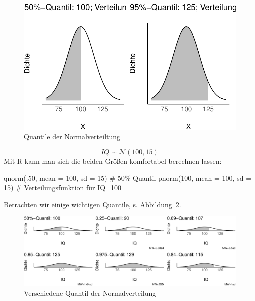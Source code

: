 \documentclass[
  a4paper,
  DIV=11]{scrreprt}
\newenvironment{Shaded}{\begin{snugshade}}{\end{snugshade}}
\newcommand{\AttributeTok}[1]{\textcolor[rgb]{0.40,0.45,0.13}{#1}}
\newcommand{\CommentTok}[1]{\textcolor[rgb]{0.37,0.37,0.37}{#1}}
\newcommand{\DecValTok}[1]{\textcolor[rgb]{0.68,0.00,0.00}{#1}}
\newcommand{\FunctionTok}[1]{\textcolor[rgb]{0.28,0.35,0.67}{#1}}
\newcommand{\NormalTok}[1]{\textcolor[rgb]{0.00,0.23,0.31}{#1}}
\theoremstyle{definition}
\theoremstyle{remark}
\begin{document}
\begin{figure}

{\centering \includegraphics{./Verteilungen_files/figure-pdf/fig-nv-quants-1.pdf}

}

\caption{\label{fig-nv-quants}Quantile der Normalverteiltung}

\end{figure}

\[IQ \sim \mathcal{N}(100, 15)\] Mit R kann man sich die beiden Größen
komfortabel berechnen lassen:

\begin{Shaded}
\begin{Highlighting}[]
\FunctionTok{qnorm}\NormalTok{(.}\DecValTok{50}\NormalTok{, }\AttributeTok{mean =} \DecValTok{100}\NormalTok{, }\AttributeTok{sd =} \DecValTok{15}\NormalTok{)  }\CommentTok{\# 50\%{-}Quantil}
\FunctionTok{pnorm}\NormalTok{(}\DecValTok{100}\NormalTok{, }\AttributeTok{mean =} \DecValTok{100}\NormalTok{, }\AttributeTok{sd =} \DecValTok{15}\NormalTok{)  }\CommentTok{\# Verteilungsfunktion für IQ=100}
\end{Highlighting}
\end{Shaded}

Betrachten wir einige wichtigen Quantile, s.
Abbildung~\ref{fig-nv-quants2}.

\begin{figure}

{\centering \includegraphics{./Verteilungen_files/figure-pdf/fig-nv-quants2-1.pdf}

}

\caption{\label{fig-nv-quants2}Verschiedene Quantil der
Normalverteilung}

\end{figure}
\end{document}
